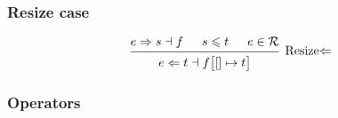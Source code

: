 \documentclass{article}
\renewcommand{\S}{\ensuremath{\Rightarrow}}
\newcommand{\C}{\ensuremath{\Leftarrow}}
\newcommand{\s}[3]{#1 \S{} #2 \dashv{} #3}
\renewcommand{\c}[3]{#1 \C{} #2 \dashv{} #3}
\begin{document}
\subsubsection*{Resize case}

\begin{equation*}
    \begin{prooftree}
        \hypo{\s{e}{s}{f}}
        \hypo{s \leqslant t}
        \hypo{e \in \mathcal{R}}
        \infer3[Resize\C]{\c{e}{t}{f\big[{[]}\mapsto t\big]}}
    \end{prooftree}
\end{equation*}

\subsubsection*{Operators}
\end{document}
